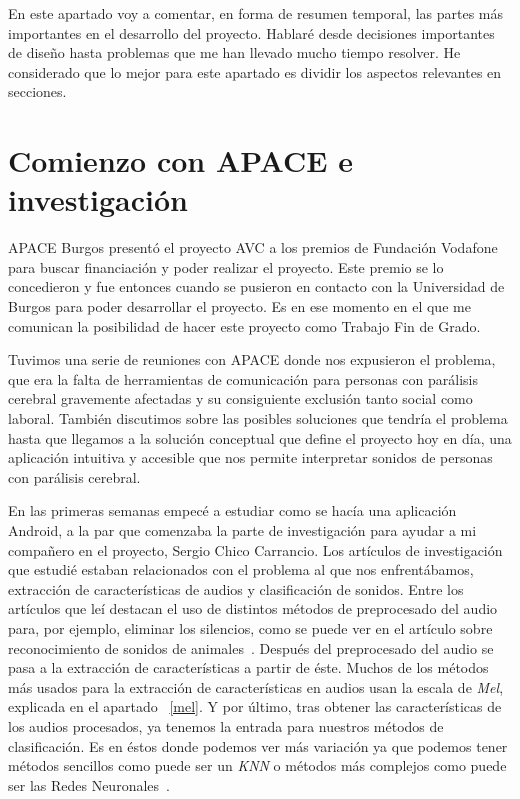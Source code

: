 
En este apartado voy a comentar, en forma de resumen temporal, las partes más importantes en el desarrollo del proyecto. Hablaré desde decisiones importantes de diseño hasta problemas que me han llevado mucho tiempo resolver. He considerado que lo mejor para este apartado es dividir los aspectos relevantes en secciones.

\section{Comienzo con APACE e investigación}
APACE Burgos presentó el proyecto AVC a los premios de Fundación Vodafone para buscar financiación y poder realizar el proyecto. Este premio se lo concedieron y fue entonces cuando se pusieron en contacto con la Universidad de Burgos para poder desarrollar el proyecto. Es en ese momento en el que me comunican la posibilidad de hacer este proyecto como Trabajo Fin de Grado.

Tuvimos una serie de reuniones con APACE donde nos expusieron el problema, que era la falta de herramientas de comunicación para personas con parálisis cerebral gravemente afectadas y su consiguiente exclusión tanto social como laboral. También discutimos sobre las posibles soluciones que tendría el problema hasta que llegamos a la solución conceptual que define el proyecto hoy en día, una aplicación intuitiva y accesible que nos permite interpretar sonidos de personas con parálisis cerebral.

En las primeras semanas empecé a estudiar como se hacía una aplicación Android, a la par que comenzaba la parte de investigación para ayudar a mi compañero en el proyecto, Sergio Chico Carrancio. Los artículos de investigación que estudié estaban relacionados con el problema al que nos enfrentábamos, extracción de características de audios y clasificación de sonidos. Entre los artículos que leí destacan el uso de distintos métodos de preprocesado del audio para, por ejemplo, eliminar los silencios, como se puede ver en el artículo sobre reconocimiento de sonidos de animales~\cite{yeo2011animal}. Después del preprocesado del audio se pasa a la extracción de características a partir de éste. Muchos de los métodos más usados para la extracción de características en audios usan la escala de \textit{Mel}, explicada en el apartado ~\ref{mel}. Y por último, tras obtener las características de los audios procesados, ya tenemos la entrada para nuestros métodos de clasificación. Es en éstos donde podemos ver más variación ya que podemos tener métodos sencillos como puede ser un \textit{KNN} o métodos más complejos como puede ser las Redes Neuronales~\cite{pandeya2018domestic}.

